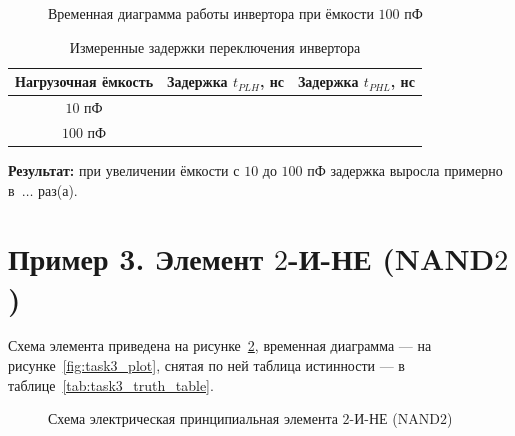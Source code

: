 \documentclass[12pt,a4paper]{article}
\theoremstyle{plain}
\theoremstyle{definition}
\theoremstyle{remark}
\numberwithin{equation}{section}
\begin{document}
\begin{figure}[H]
    \centering
    \caption{Временная диаграмма работы инвертора при ёмкости $100$ пФ}
    \label{fig:task2_plot_100pF}
\end{figure}

\begin{table}[H]
    \centering
    \begin{tabularx}{\textwidth}{|C|C|C|}
        \hline
        Нагрузочная ёмкость & Задержка $t_{PLH}$, нс & Задержка $t_{PHL}$, нс \\
        \hline
        $10$ пФ & & \\ \hline
        $100$ пФ & & \\
        \hline
    \end{tabularx}
    \caption{Измеренные задержки переключения инвертора}
    \label{tab:task2_delays}
\end{table}

\textbf{Результат:} при увеличении ёмкости с $10$ до $100$ пФ задержка выросла примерно в~$\dots$ раз(а).

\section{Пример 3. Элемент $2$-И-НЕ (NAND$2$)}

Схема элемента приведена на рисунке~\ref{fig:task3_circuit}, временная диаграмма — 
на рисунке~\ref{fig:task3_plot}, снятая по ней таблица истинности — в таблице~\ref{tab:task3_truth_table}.

\begin{figure}[H]
    \centering
    \caption{Схема электрическая принципиальная элемента $2$-И-НЕ (NAND$2$)}
    \label{fig:task3_circuit}
\end{figure}
\end{document}
